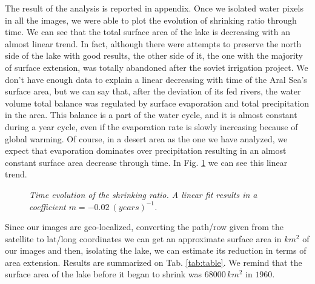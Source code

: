 The result of the analysis is reported in appendix. 
Once we isolated water pixels in all the images, we were able to plot the evolution of shrinking ratio through time. 
We can see that the total surface area of the lake is decreasing with an almost linear trend. 
In fact, although there were attempts to preserve the north side of the lake with good results, the other side of it, the one with the majority of surface extension, was totally abandoned after the soviet irrigation project. 
We don't have enough data to explain a linear decreasing with time of the Aral Sea's surface area, but we can say that, after the deviation of its fed rivers, the water volume total balance was regulated by surface evaporation and total precipitation in the area. 
This balance is a part of the water cycle, and it is almost constant during a year cycle, even if the evaporation rate is slowly increasing because of global warming. 
Of course, in a desert area as the one we have analyzed, we expect that evaporation dominates over precipitation resulting in an almost constant surface area decrease through time.
In Fig. \ref{fig:expo} we can see this linear trend.
\begin{figure}[H]
    \centering
    \scalebox{.7}{}
    \caption{\emph{Time evolution of the shrinking ratio.
                    A linear fit results in a coefficient $m=-0.02 \ \left(years\right)^{-1}$.}}
    \label{fig:expo}
\end{figure}
Since our images are geo-localized, converting the path/row given from the satellite to lat/long coordinates we can get an approximate surface area in $km^2$ of our images and then, isolating the lake, we can estimate its reduction in terms of area extension. 
Results are summarized on Tab. \ref{tab:table}. We remind that the surface area of the lake before it began to shrink was $68000\,km^2$ in $1960$.
